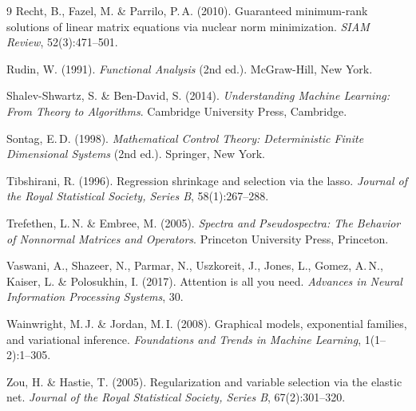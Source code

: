 ﻿\documentclass[12pt, a4paper]{article}
\theoremstyle{definition}
\theoremstyle{remark}
\begin{document}
\begin{thebibliography}{9}
Recht, B., Fazel, M. \& Parrilo, P.\,A. (2010).
\newblock Guaranteed minimum-rank solutions of linear matrix equations via
  nuclear norm minimization.
\newblock \textit{SIAM Review}, 52(3):471--501.

Rudin, W. (1991).
\newblock \textit{Functional Analysis} (2nd ed.).
\newblock McGraw-Hill, New York.

Shalev-Shwartz, S. \& Ben-David, S. (2014).
\newblock \textit{Understanding Machine Learning: From Theory to Algorithms}.
\newblock Cambridge University Press, Cambridge.

Sontag, E.\,D. (1998).
\newblock \textit{Mathematical Control Theory: Deterministic Finite Dimensional
  Systems} (2nd ed.).
\newblock Springer, New York.

Tibshirani, R. (1996).
\newblock Regression shrinkage and selection via the lasso.
\newblock \textit{Journal of the Royal Statistical Society, Series B},
  58(1):267--288.

Trefethen, L.\,N. \& Embree, M. (2005).
\newblock \textit{Spectra and Pseudospectra: The Behavior of Nonnormal
  Matrices and Operators}.
\newblock Princeton University Press, Princeton.

Vaswani, A., Shazeer, N., Parmar, N., Uszkoreit, J., Jones, L., Gomez, A.\,N.,
  Kaiser, L. \& Polosukhin, I. (2017).
\newblock Attention is all you need.
\newblock \textit{Advances in Neural Information Processing Systems}, 30.

Wainwright, M.\,J. \& Jordan, M.\,I. (2008).
\newblock Graphical models, exponential families, and variational inference.
\newblock \textit{Foundations and Trends in Machine Learning}, 1(1--2):1--305.

Zou, H. \& Hastie, T. (2005).
\newblock Regularization and variable selection via the elastic net.
\newblock \textit{Journal of the Royal Statistical Society, Series B},
  67(2):301--320.

\end{thebibliography}
\end{document}
